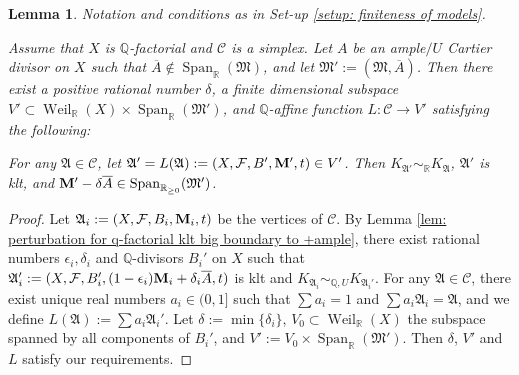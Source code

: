\documentclass[12pt]{amsart}
\numberwithin{equation}{section}
\newcommand{\Mm}{{\bf{M}}}
\newcommand{\Span}{\operatorname{Span}}
\newcommand{\Weil}{\operatorname{Weil}}
\newcommand{\Aa}{{\mathfrak{A}}}
\newcommand{\Ff}{\mathcal{F}}
\newcommand{\MM}{{\mathfrak{M}}}
\newtheorem{lem}[thm]{Lemma}
\theoremstyle{definition}
\theoremstyle{definition}
\theoremstyle{definition}
\begin{document}
\begin{lem}\label{lem: first translation to greater than ample}
Notation and conditions as in Set-up \ref{setup: finiteness of models}.

Assume that $X$ is $\mathbb Q$-factorial and $\mathcal{C}$ is a simplex. Let $A$ be an ample$/U$ Cartier divisor on $X$ such that $\overline{A}\not\in\Span_{\mathbb R}(\MM)$, and let $\MM':=(\MM,\overline{A})$. 
Then there exist a positive rational number $\delta$, a finite dimensional subspace $V'\subset\Weil_{\mathbb R}(X)\times\Span_{\mathbb R}(\MM')$, and $\mathbb Q$-affine function $L: \mathcal{C}\rightarrow V'$ satisfying the following: 

For any $\Aa\in\mathcal{C}$, let $\Aa'=L(\Aa):=(X,\Ff,B',\Mm',t)\in V'$. Then $K_{\Aa'}\sim_{\mathbb R}K_{\Aa}$, $\Aa'$ is klt, and $\Mm'-\delta\overline{A}\in\Span_{\mathbb R_{\geq 0}}(\MM')$.
\end{lem}
\begin{proof}
    Let $\Aa_i:=(X,\Ff,B_i,\Mm_i,t)$ be the vertices of $\mathcal{C}$. By Lemma \ref{lem: perturbation for q-factorial klt big boundary to +ample}, there exist rational numbers $\epsilon_i,\delta_i$ and $\mathbb Q$-divisors $B_i'$ on $X$ such that $\Aa_i':=(X,\Ff,B_i',(1-\epsilon_i)\Mm_i+\delta_i\overline{A},t)$ is klt and $K_{\Aa_i}\sim_{\mathbb Q,U}K_{\Aa_i'}$. For any $\Aa\in\mathcal{C}$, there exist unique real numbers $a_i\in (0,1]$ such that $\sum a_i=1$ and $\sum a_i\Aa_i=\Aa$, and we define $L(\Aa):=\sum a_i\Aa_i'$. Let $\delta:=\min\{\delta_i\}$, $V_0\subset\Weil_{\mathbb R}(X)$ the subspace spanned by all components of $B_i'$, and $V':=V_0\times\Span_{\mathbb R}(\MM')$. Then $\delta$, $V'$ and $L$ satisfy our requirements.
\end{proof}
\end{document}
